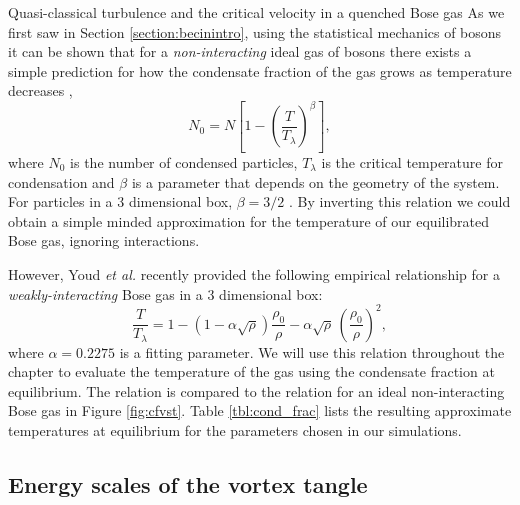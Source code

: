 \begin{chapter}{\label{cha:nonequib}Quasi-classical turbulence and the critical velocity in a quenched Bose gas}
As we first saw in Section \ref{section:becinintro}, using the statistical mechanics of bosons it can be shown that for a {\it non-interacting} ideal gas of bosons there exists a simple prediction for how the condensate fraction of the gas grows as temperature decreases \cite{Pethick},
\begin{equation}
N_0 = N \left [ 1-\left ( \frac{T}{T_\lambda} \right )^\beta \right ],
\end{equation}
where $N_0$ is the number of condensed particles, $T_{\lambda}$ is the critical temperature for condensation and $\beta$ is a parameter that depends on the geometry of the system. For particles in a 3 dimensional box, $\beta=3/2$ \cite{Pethick}. By inverting this relation we could obtain a simple minded approximation for the temperature of our equilibrated Bose gas, ignoring interactions.

However, Youd {\it et al.} \cite{berloff_2007} recently provided the following empirical relationship for a {\it weakly-interacting} Bose gas in a 3 dimensional box:
\begin{equation}
  \frac{T}{T_\lambda} = 1 - (1 - \alpha\sqrt{\rho})\frac{\rho_0}{\rho} - \alpha\sqrt{\rho}\,\left(\frac{\rho_0}{\rho}\right)^2,
  \label{eq:temp}
\end{equation}
where $\alpha=0.2275$ is a fitting parameter. We will use this relation throughout the chapter to evaluate the temperature of the gas using the condensate fraction at equilibrium. The relation is compared to the relation for an ideal non-interacting Bose gas in Figure \ref{fig:cfvst}. Table \ref{tbl:cond_frac} lists the resulting approximate temperatures at equilibrium for the parameters chosen in our simulations.

\subsection{Energy scales of the vortex tangle}



\end{chapter}
